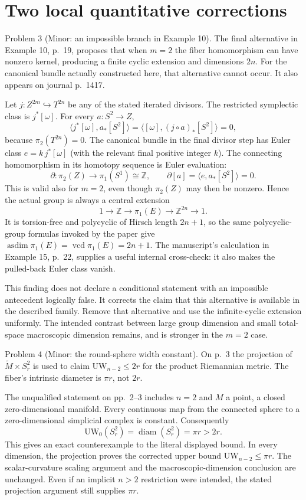 \documentclass[10pt]{article}
\begin{document}
\section*{Two local quantitative corrections}
Problem 3 (Minor: an impossible branch in Example 10).  The final alternative in Example 10, p. 19, proposes that when \(m=2\) the fiber homomorphism can have nonzero kernel, producing a finite cyclic extension and dimensions \(2n\). For the canonical bundle actually constructed here, that alternative cannot occur. It also appears on journal p. 1417.\par
Let \(j:Z^{2m}\hookrightarrow T^{2n}\) be any of the stated iterated divisors. The restricted symplectic class is \(j^*[\omega]\). For every \(a:S^2\to Z\), \[\langle j^*[\omega],a_*[S^2]\rangle
 =\langle[\omega],(j\circ a)_*[S^2]\rangle=0,\] because \(\pi_2(T^{2n})=0\). The canonical bundle in the final divisor step has Euler class \(e=k\,j^*[\omega]\) (with the relevant final positive integer \(k\)). The connecting homomorphism in its homotopy sequence is Euler evaluation: \[\partial:\pi_2(Z)\longrightarrow\pi_1(S^1)\cong\mathbb Z,\qquad
 \partial[a]=\langle e,a_*[S^2]\rangle=0.\] This is valid also for \(m=2\), even though \(\pi_2(Z)\) may then be nonzero. Hence the actual group is always a central extension \[1\longrightarrow\mathbb Z\longrightarrow\pi_1(E)
   \longrightarrow\mathbb Z^{2n}\longrightarrow1.\] It is torsion-free and polycyclic of Hirsch length \(2n+1\), so the same polycyclic-group formulas invoked by the paper give \(\mathop{\mathrm{asdim}}\pi_1(E)=\mathop{\mathrm{vcd}}\pi_1(E)=2n+1\). The manuscript’s calculation in Example 15, p. 22, supplies a useful internal cross-check: it also makes the pulled-back Euler class vanish.\par
This finding does not declare a conditional statement with an impossible antecedent logically false. It corrects the claim that this alternative is available in the described family. Remove that alternative and use the infinite-cyclic extension uniformly. The intended contrast between large group dimension and small total-space macroscopic dimension remains, and is stronger in the \(m=2\) case.\par
Problem 4 (Minor: the round-sphere width constant).  On p. 3 the projection of \(\widetilde M\times S_r^2\) is used to claim \(\mathrm{UW}_{n-2}\le2r\) for the product Riemannian metric. The fiber’s intrinsic diameter is \(\pi r\), not \(2r\).\par
The unqualified statement on pp. 2–3 includes \(n=2\) and \(M\) a point, a closed zero-dimensional manifold. Every continuous map from the connected sphere to a zero-dimensional simplicial complex is constant. Consequently \[\mathrm{UW}_0(S_r^2)=\mathop{\mathrm{diam}}(S_r^2)=\pi r>2r.\] This gives an exact counterexample to the literal displayed bound. In every dimension, the projection proves the corrected upper bound \(\mathrm{UW}_{n-2}\le\pi r\). The scalar-curvature scaling argument and the macroscopic-dimension conclusion are unchanged. Even if an implicit \(n>2\) restriction were intended, the stated projection argument still supplies \(\pi r\).\par
\end{document}
